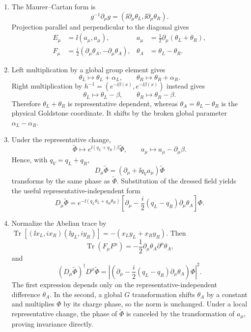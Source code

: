 \begin{enumerate}
  \begin{enumerate}
    \item[(a)]
    The Maurer--Cartan form is
    \[
      g^{-1}\partial_\mu g
        =(\ii\partial_\mu\theta_L,\ii\partial_\mu\theta_R).
    \]
    Projection parallel and perpendicular to the diagonal gives
    \[
      \boxed{\begin{aligned}
        E_\mu&=\ii(a_\mu,a_\mu),&
        a_\mu&=\frac12\partial_\mu(\theta_L+\theta_R),\\
        F_\mu&=\frac i2
          (\partial_\mu\theta_A,-\partial_\mu\theta_A),&
        \theta_A&=\theta_L-\theta_R .
      \end{aligned}}
    \]
    \item[(b)]
    Left multiplication by a global group element gives
    \[
      \theta_L\mapsto\theta_L+\alpha_L,\qquad
      \theta_R\mapsto\theta_R+\alpha_R.
    \]
    Right multiplication by
    \(h^{-1}=(e^{-\ii\beta(x)},e^{-\ii\beta(x)})\) instead gives
    \[
      \theta_L\mapsto\theta_L-\beta,\qquad
      \theta_R\mapsto\theta_R-\beta.
    \]
    Therefore \(\theta_L+\theta_R\) is representative dependent, whereas
    \(\theta_A=\theta_L-\theta_R\) is the physical Goldstone coordinate.
    It shifts by the broken global parameter
    \(\alpha_L-\alpha_R\).
    \item[(c)]
    Under the representative change,
    \[
      \widetilde\Phi\mapsto
        e^{\ii(q_L+q_R)\beta}\widetilde\Phi,\qquad
      a_\mu\mapsto a_\mu-\partial_\mu\beta .
    \]
    Hence, with \(q_V=q_L+q_R\),
    \[
      D_\mu\widetilde\Phi
        =(\partial_\mu+\ii q_Va_\mu)\widetilde\Phi
    \]
    transforms by the same phase as \(\widetilde\Phi\).  Substitution of
    the dressed field yields the useful representative-independent form
    \[
      \boxed{D_\mu\widetilde\Phi
        =e^{-\ii(q_L\theta_L+q_R\theta_R)}
        \left[\partial_\mu
        -\frac i2(q_L-q_R)\partial_\mu\theta_A\right]\Phi .}
    \]
    \item[(d)]
    Normalize the Abelian trace by
    \(\operatorname{Tr}[(\ii x_L,ix_R)(\ii y_L,iy_R)]
      =-(x_Ly_L+x_Ry_R)\).  Then
    \[
      \boxed{\operatorname{Tr}(F_\mu F^\mu)
        =-\frac12\partial_\mu\theta_A\partial^\mu\theta_A,}
    \]
    and
    \[
      \boxed{(D_\mu\widetilde\Phi)^\dagger
        D^\mu\widetilde\Phi
        =\left|\left(\partial_\mu
          -\frac i2(q_L-q_R)\partial_\mu\theta_A\right)\Phi\right|^2.}
    \]
    The first expression depends only on the representative-independent
    difference \(\theta_A\).  In the second, a global \(G\) transformation
    shifts \(\theta_A\) by a constant and multiplies \(\Phi\) by its charge
    phase, so the norm is unchanged.  Under a local representative change,
    the phase of \(\widetilde\Phi\) is canceled by the transformation of
    \(a_\mu\), proving invariance directly.
  \end{enumerate}


\end{enumerate}
